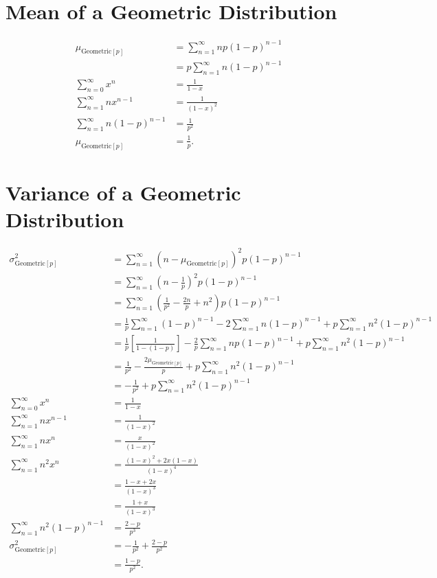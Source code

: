 \documentclass{myart}
\newcommand{\mean}{\mu}
\newcommand{\variance}{\sigma^2}
\newcommand{\sub}[1]{_{\text{#1}}}
\begin{document}
\section{Mean of a Geometric Distribution}

\begin{align*}
\mean\sub{Geometric$[p]$} &= \sum_{n=1}^\infty n p (1-p)^{n-1} \\
&= p \sum_{n=1}^\infty n (1-p)^{n-1} \\
\sum_{n=0}^\infty x^n &= \frac{1}{1-x} \\
\sum_{n=1}^\infty n x^{n-1} &= \frac{1}{(1-x)^2} \\
\sum_{n=1}^\infty n (1-p)^{n-1} &= \frac{1}{p^2} \\
\mean\sub{Geometric$[p]$} &= \frac{1}{p}.
\end{align*}

\section{Variance of a Geometric Distribution}

\begin{align*}
   \variance\sub{Geometric$[p]$}
&= \sum_{n=1}^\infty
     (n - \mean\sub{Geometric$[p]$})^2 p (1-p)^{n-1} \\
&= \sum_{n=1}^\infty \left(n - \frac{1}{p}\right)^2 p (1-p)^{n-1} \\
&= \sum_{n=1}^\infty \left(
     \frac{1}{p^2} - \frac{2n}{p} + n^2
   \right) p (1-p)^{n-1} \\
&=   \frac{1}{p} \sum_{n=1}^\infty (1-p)^{n-1}
   - 2 \sum_{n=1}^\infty n(1-p)^{n-1}
   + p \sum_{n=1}^\infty n^2 (1-p)^{n-1} \\
&=   \frac{1}{p} \left[\frac{1}{1 - (1-p)}\right]
   - \frac{2}{p} \sum_{n=1}^\infty n p (1-p)^{n-1}
   + p \sum_{n=1}^\infty n^2 (1-p)^{n-1} \\
&=   \frac{1}{p^2}
   - \frac{2 \mean\sub{Geometric$[p]$}}{p}
   + p \sum_{n=1}^\infty n^2 (1-p)^{n-1} \\
&= -\frac{1}{p^2} + p \sum_{n=1}^\infty n^2 (1-p)^{n-1} \\
   \sum_{n=0}^\infty x^n
&= \frac{1}{1-x} \\
   \sum_{n=1}^\infty n x^{n-1}
&= \frac{1}{(1-x)^2} \\
   \sum_{n=1}^\infty n x^n
&= \frac{x}{(1-x)^2} \\
   \sum_{n=1}^\infty n^2 x^n
&= \frac{(1-x)^2 + 2x(1-x)}{(1-x)^4} \\
&= \frac{1 - x + 2x}{(1-x)^3} \\
&= \frac{1+x}{(1-x)^3} \\
   \sum_{n=1}^\infty n^2 (1-p)^{n-1}
&= \frac{2-p}{p^3} \\
   \variance\sub{Geometric$[p]$}
&= -\frac{1}{p^2} + \frac{2-p}{p^2} \\
&= \frac{1-p}{p^2}.
\end{align*}
\end{document}
